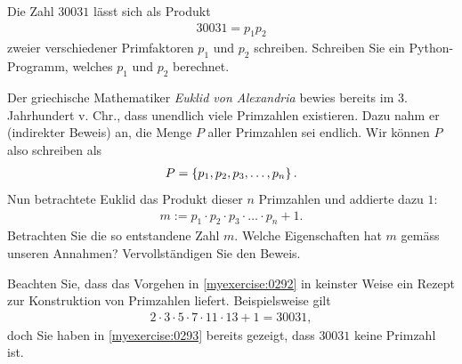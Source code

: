 \begin{myexercise}\label{myexercise:0293}
	Die Zahl $30031$ lässt sich als Produkt
	\begin{align*}
		30031 = p_1p_2
	\end{align*}
	zweier verschiedener Primfaktoren $p_1$ und $p_2$ schreiben. Schreiben Sie ein Python-Programm, welches $p_1$ und $p_2$ berechnet.
\end{myexercise}

\begin{myexercise}\label{myexercise:0292}
	Der griechische Mathematiker \textit{Euklid von Alexandria} bewies bereits im 3. Jahrhundert v. Chr., dass unendlich viele Primzahlen existieren. Dazu nahm er (indirekter Beweis) an, die Menge $P$ aller Primzahlen sei endlich. Wir können $P$ also schreiben als
	\begin{align*}
		P = \left\{p_1, p_2, p_3, \ldots , p_n\right\}.
	\end{align*}
	Nun betrachtete Euklid das Produkt dieser $n$ Primzahlen und addierte dazu $1$:
	\begin{align*}
		m := p_1\cdot p_2\cdot p_3\cdot \ldots \cdot p_n + 1.
	\end{align*}
	Betrachten Sie die so entstandene Zahl $m$. Welche Eigenschaften hat $m$ gemäss unseren Annahmen? Vervollständigen Sie den Beweis.
\end{myexercise}

\begin{myremark}
	Beachten Sie, dass das Vorgehen in \cref{myexercise:0292} in keinster Weise ein Rezept zur Konstruktion von Primzahlen liefert. Beispielsweise gilt
	\begin{align*}
		2\cdot 3\cdot 5\cdot 7\cdot 11\cdot 13 + 1 = 30031,
	\end{align*}
	doch Sie haben in \cref{myexercise:0293} bereits gezeigt, dass $30031$ keine Primzahl ist.
\end{myremark}

\clearpage
